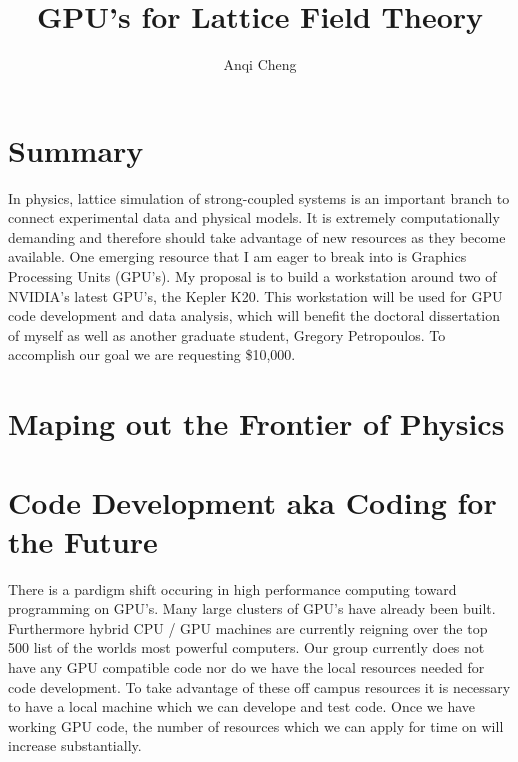 \documentclass[11pt]{article}
\begin{document}
  \title{GPU's for Lattice Field Theory}
  \author{Anqi Cheng}
  \maketitle

   \section*{Summary} %
In physics, lattice simulation of strong-coupled systems is an important branch to connect experimental data and physical models. It is extremely computationally demanding and therefore should take advantage of new  resources as they become available.
   One emerging resource that I am eager to break into is Graphics Processing Units (GPU's).   
  My proposal is to build a workstation around two of NVIDIA's latest GPU's, the Kepler K20.  
  This workstation will be used for GPU code development and data analysis, which will benefit the doctoral dissertation of myself as well as another graduate student, Gregory Petropoulos.  
  To accomplish our goal we are requesting \$10,000.  
 
  \section*{Maping out the Frontier of Physics} %
  
  
  \section*{Code Development aka Coding for the Future} %
  There is a pardigm shift occuring in high performance computing toward programming on GPU's.  
  Many large clusters of GPU's have already been built.
  Furthermore hybrid CPU / GPU machines are currently reigning over the top 500 list of the worlds most powerful computers.
  Our group currently does not have any GPU compatible code nor do we have the local resources needed for code development.  
  To take advantage of these off campus resources it is necessary to have a local machine which we can develope and test code.
  Once we have working GPU code, the number of resources which we can apply for time on will increase substantially.
\end{document}
